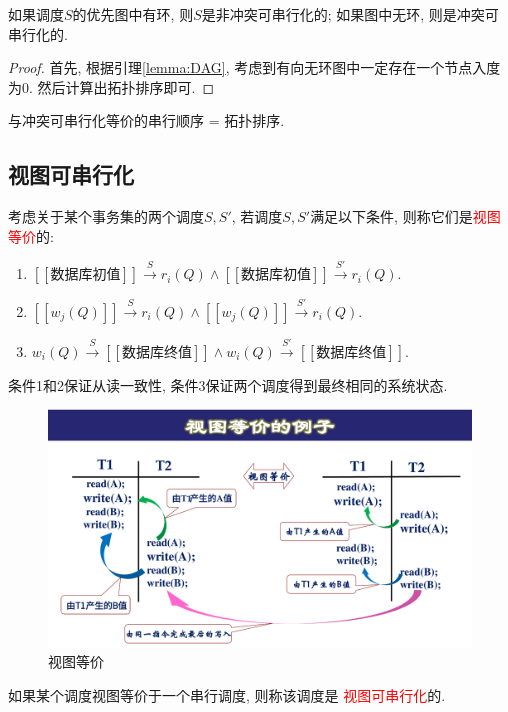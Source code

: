 \begin{theorem}
  如果调度$S$的优先图中有环, 则$S$是非冲突可串行化的;
  如果图中无环, 则是冲突可串行化的.
\end{theorem}

\begin{proof}
  首先, 根据引理\ref{lemma:DAG}, 考虑到有向无环图中一定存在一个节点入度为0. 然后计算出拓扑排序即可.
\end{proof}

与冲突可串行化等价的串行顺序 = 拓扑排序.

\subsection{视图可串行化}

\begin{definition}[视图等价]
  考虑关于某个事务集的两个调度$S,S'$, 若调度$S,S'$满足以下条件, 则称它们是\textcolor{red}{视图等价}的:
  \begin{enumerate}
      \item $[\![\text{数据库初值}]\!]\overset{S}{\to}r_i(Q)\land [\![\text{数据库初值}]\!]\overset{S'}{\to}r_i(Q)$.
      \item $[\![w_j(Q)]\!]\overset{S}{\to}r_i(Q)\land [\![w_j(Q)]\!]\overset{S'}{\to}r_i(Q)$.
      \item $w_i(Q)\overset{S}{\to}[\![\text{数据库终值}]\!]\land w_i(Q)\overset{S'}{\to}[\![\text{数据库终值}]\!]$.
  \end{enumerate}
\end{definition}
\begin{remark}
  条件1和2保证从读一致性, 条件3保证两个调度得到最终相同的系统状态.
\end{remark}

\begin{figure}[H]
    \centering
    \includegraphics[width=.7\textwidth]{./figure/视图等价.pdf}
    \caption{视图等价}
\end{figure}


\begin{definition}[视图可串行化]
  如果某个调度视图等价于一个串行调度, 则称该调度是
  \textcolor{red}{视图可串行化}的.
\end{definition}

